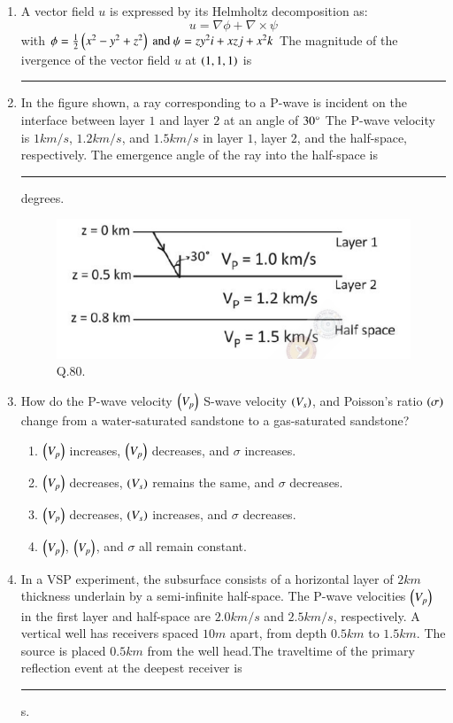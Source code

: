 \documentclass[journal,12pt,onecolumn]{IEEEtran}
\theoremstyle{remark}
\begin{document}
\begin{enumerate}
    \item A vector field $u$ is expressed by its Helmholtz decomposition as: 
    $$ u = \nabla\phi + \nabla \times \psi $$ with $\phi = \frac{1}{2}\left(x^2 - y^2 +z^2\right) \text{ and } \psi = zy^2i + xzj + x^2k $ The magnitude of the ivergence of the vector field $u$ at $\left(1,1,1\right)$ is \rule{3cm}{0.15mm} \hfill{}
    
    \item In the figure shown, a ray corresponding to a P-wave is incident on the interface between layer $1$ and layer $2$ at an angle of $30\degree$ The P-wave velocity is $1 km/s$, $1.2 km/s$, and $1.5 km/s$ in layer $1$, layer $2$, and the half-space, respectively. The emergence angle of the ray into the half-space is \rule{3cm}{0.15mm} degrees.  \hfill{}
    
    \begin{figure}[h]
        \centering
        \includegraphics[width=0.5\columnwidth]{Figs/fig_12.png}
        \caption{Q.80.}
        \label{fig:placeholder_12}
    \end{figure}
    
    \item How do the P-wave velocity $\left(V_p\right)$ S-wave velocity $\left(V_s\right)$, and Poisson's ratio $\left(\sigma\right)$ change from a water-saturated sandstone to a gas-saturated sandstone? \hfill{}
                \begin{enumerate}
                        \item $\left(V_p\right)$ increases, $\left(V_p\right)$ decreases, and $\sigma$ increases.
                        \item $\left(V_p\right)$ decreases, $\left(V_s\right)$ remains the same, and $\sigma$ decreases.
                        \item $\left(V_p\right)$ decreases, $\left(V_s\right)$ increases, and $\sigma$ decreases.
                        \item $\left(V_p\right)$, $\left(V_p\right)$, and $\sigma$ all remain constant.
                \end{enumerate}
    
    \item In a VSP experiment, the subsurface consists of a horizontal layer of $2 km$ thickness underlain by a semi-infinite half-space. The P-wave velocities $\left(V_p\right)$ in the first layer and half-space are $2.0 km/s$ and $2.5 km/s$, respectively. A vertical well has receivers spaced $10 m$ apart, from depth $0.5 km$ to $1.5 km$. The source is placed $0.5 km$ from the well head.The traveltime of the primary reflection event at the deepest receiver is \rule{3cm}{0.15mm}s. \hfill{}
    

\end{enumerate}
\end{document}
